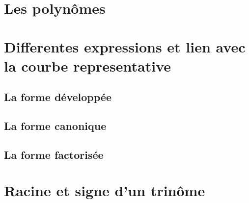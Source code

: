 
\section{Les polynômes}







\section{Differentes expressions et lien avec la courbe representative}

\subsection{La forme développée}







\subsection{La forme canonique}




\newpage


\subsection{La forme factorisée}



\section{Racine et signe d'un trinôme}

